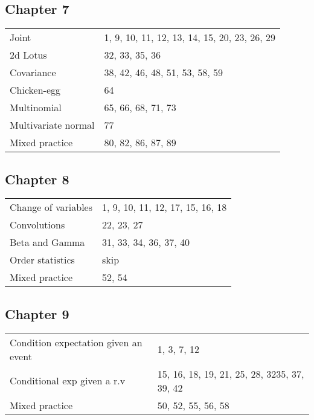 \documentclass[a4paper]{article}
\theoremstyle{definition}
\newcommand{\1}[1]{\,I_{#1}} %
\begin{document}
\subsection{Chapter 7}
\label{sec:orge23c1c7}

\begin{center}
\begin{tabular}{ll}
\hline
Joint & 1, 9, 10, 11, 12, 13, 14, 15, 20, 23, 26, 29\\
2d Lotus & 32, 33, 35, 36\\
Covariance & 38, 42, 46, 48, 51, 53, 58, 59\\
Chicken-egg & 64\\
Multinomial & 65, 66, 68, 71, 73\\
Multivariate normal & 77\\
Mixed practice & 80, 82, 86, 87, 89\\
\hline
\end{tabular}
\end{center}

\subsection{Chapter 8}
\label{sec:orgf9e086a}

\begin{center}
\begin{tabular}{ll}
\hline
Change of variables & 1, 9, 10, 11, 12, 17, 15, 16, 18\\
Convolutions & 22, 23, 27\\
Beta and Gamma & 31, 33, 34, 36, 37, 40\\
Order statistics & skip\\
Mixed practice & 52, 54\\
\hline
\end{tabular}
\end{center}

\subsection{Chapter 9}
\label{sec:org5050253}

\begin{center}
\begin{tabular}{ll}
\hline
Condition expectation given an event & 1, 3, 7, 12\\
Conditional exp given a r.v & 15, 16, 18, 19, 21, 25, 28, 3235, 37, 39, 42\\
Mixed practice & 50, 52, 55, 56, 58\\
\hline
\end{tabular}
\end{center}
\end{document}
